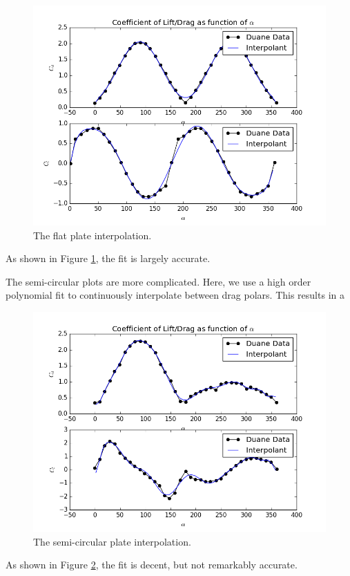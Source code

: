 \documentclass{article}
\begin{document}
\begin{figure}[!htb]
  \begin{center}
    \includegraphics[width = 12 cm]{figs/flat}
    \caption{The flat plate interpolation.} 
    \label{flat}
  \end{center}
\end{figure}
As shown in Figure \ref{flat}, the fit is largely accurate. 

The semi-circular plots are more complicated. Here, we use a high order
polynomial fit to continuously interpolate between drag polars. This
results in a 
\begin{figure}[!htb]
  \begin{center}
    \includegraphics[width = 12 cm]{figs/semi}
    \caption{The semi-circular plate interpolation.} 
    \label{semi}
  \end{center}
\end{figure}
As shown in Figure \ref{semi}, the fit is decent, but not remarkably accurate.
\end{document}
